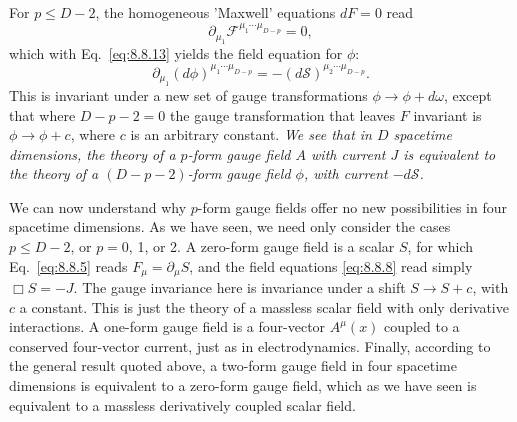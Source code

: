 For $p\leq D-2$, the homogeneous 'Maxwell' equations $dF=0$ read
\begin{equation}
\partial_{\mu_1}\mathcal F^{\mu_1\cdots\mu_{D-p}}=0,
\tag{8.8.14}\label{eq:8.8.14}
\end{equation}
which with Eq.~\eqref{eq:8.8.13} yields the field equation for $\phi$:
\begin{equation}
\partial_{\mu_1}(d\phi)^{\mu_1\cdots\mu_{D-p}}
=-(d\mathcal S)^{\mu_2\cdots\mu_{D-p}}.
\tag{8.8.15}\label{eq:8.8.15}
\end{equation}
This is invariant under a new set of gauge transformations
$\phi\to\phi+d\omega$, except that where $D-p-2=0$ the gauge transformation
that leaves $F$ invariant is $\phi\to\phi+c$, where $c$ is an arbitrary
constant. \emph{We see that in $D$ spacetime dimensions, the theory of a
$p$-form gauge field $A$ with current $J$ is equivalent to the theory of a
$(D-p-2)$-form gauge field $\phi$, with current $-d\mathcal S$.}

We can now understand why $p$-form gauge fields offer no new possibilities in
four spacetime dimensions. As we have seen, we need only consider the cases
$p\leq D-2$, or $p=0$, 1, or 2. A zero-form gauge field is a scalar $S$, for
which Eq.~\eqref{eq:8.8.5} reads $F_\mu=\partial_\mu S$, and the field equations
\eqref{eq:8.8.8} read simply $\Box S=-J$. The gauge invariance here is invariance
under a shift $S\to S+c$, with $c$ a constant. This is just the theory of a
massless scalar field with only derivative interactions. A one-form gauge
field is a four-vector $A^\mu(x)$ coupled to a conserved four-vector current,
just as in electrodynamics. Finally, according to the general result quoted
above, a two-form gauge field in four spacetime dimensions is equivalent to
a zero-form gauge field, which as we have seen is equivalent to a massless
derivatively coupled scalar field.
